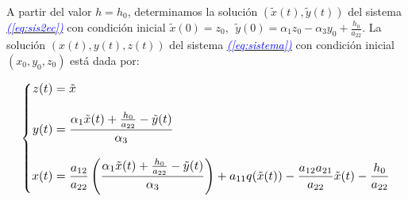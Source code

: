 \documentclass[12pt,a4paper]{report} %
\newcommand{\eref}[1]{\hyperref[#1]{\textcolor{blue}{\textit{(\ref*{#1})}}}}
\begin{document}
	\vspace{0.5cm}A partir del valor $h=h_0$, determinamos la solución $\left( \tilde{x}(t),\tilde{y}(t) \right)$ del sistema \eref{eq:sis2ec} con condición inicial $\tilde{x}(0)=z_0$, $\; \tilde{y}(0)=\alpha_1z_0-\alpha_3y_0+\frac{h_0}{a_{22}}$. La solución $(x(t),y(t),z(t))$ del sistema \eref{eq:sistema} con condición inicial $(x_0,y_0,z_0)$ está dada por:
	
	\begin{equation}
		\label{eq:solsis}
		\scalebox{1.1}{$\displaystyle
			\left\{
			\begin{aligned}
				z(t)&=\tilde{x} \\[3mm]
				y(t)&= \frac{\alpha_1\tilde{x}(t)+\frac{h_0}{a_{22}}-\tilde{y}(t)}{\alpha_3}\\[3mm]
				x(t)&=\frac{a_{12}}{a_{22}}\left( \frac{\alpha_1\tilde{x}(t)+\frac{h_0}{a_{22}}-\tilde{y}(t)}{\alpha_3} \right) +a_{11}q(\tilde{x}(t))-\frac{a_{12}a_{21}}{a_{22}}\tilde{x}(t)-\frac{h_0}{a_{22}}
			\end{aligned}
			\right.
			$}
	\end{equation}\smallskip
	

	

	
\end{document}
